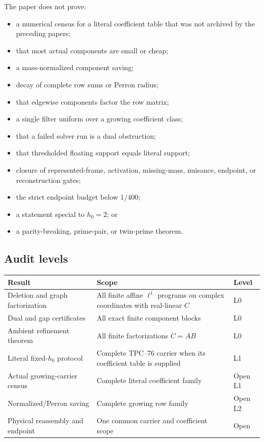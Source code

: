 The paper does not prove:
\begin{itemize}
 \item a numerical census for a literal coefficient table that was not
       archived by the preceding papers;
 \item that most actual components are small or cheap;
 \item a mass-normalized component saving;
 \item decay of complete row sums or Perron radius;
 \item that edgewise components factor the row matrix;
 \item a single filter uniform over a growing coefficient class;
 \item that a failed solver run is a dual obstruction;
 \item that thresholded floating support equals literal support;
 \item closure of represented-frame, activation, missing-mass,
       nuisance, endpoint, or reconstruction gates;
 \item the strict endpoint budget below \(1/400\);
 \item a statement special to \(h_0=2\); or
 \item a parity-breaking, prime-pair, or twin-prime theorem.
\end{itemize}

\subsection{Audit levels}

\begin{center}
\begin{tabular}{p{}p{}l}
\toprule
Result & Scope & Level\\
\midrule
Deletion and graph factorization &
All finite affine \(\ell^1\) programs on complex coordinates with
real-linear \(C\) & L0\\
Dual and gap certificates &
All exact finite component blocks & L0\\
Ambient refinement theorem &
All finite factorizations \(C=AB\) & L0\\
Literal fixed-\(h_0\) protocol &
Complete TPC--76 carrier when its coefficient table is supplied & L1\\
Actual growing-carrier census &
Complete literal coefficient family & Open L1\\
Normalized/Perron saving &
Complete growing row family & Open L2\\
Physical reassembly and endpoint &
One common carrier and coefficient scope & Open\\
\bottomrule
\end{tabular}
\end{center}

